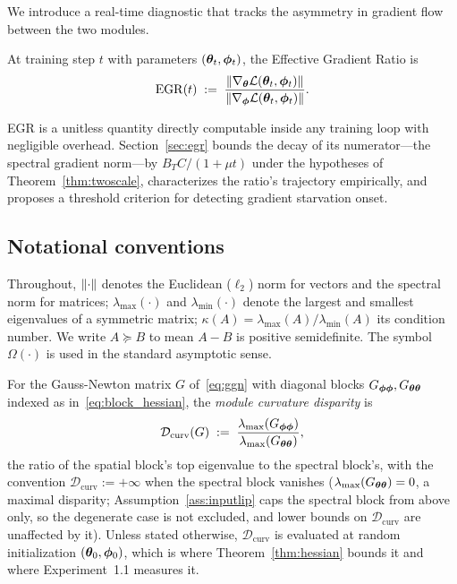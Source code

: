 We introduce a real-time diagnostic that tracks the asymmetry in
gradient flow between the two modules.

\begin{definition}
\label{def:egr}
At training step $t$ with parameters $({\boldsymbol{\theta}}_t, {\boldsymbol{\phi}}_t)$, the
Effective Gradient Ratio is
\[
    \mathrm{EGR}(t) \;:=\; \frac{\left\lVert\nabla_{\boldsymbol{\theta}} \mathcal{L}({\boldsymbol{\theta}}_t, {\boldsymbol{\phi}}_t)\right\rVert}
                        {\left\lVert\nabla_{\boldsymbol{\phi}} \mathcal{L}({\boldsymbol{\theta}}_t, {\boldsymbol{\phi}}_t)\right\rVert}.
\]
\end{definition}

\begin{remark}
EGR is a unitless quantity directly computable inside any training
loop with negligible overhead. Section~\ref{sec:egr} bounds the decay
of its numerator---the spectral gradient norm---by
$B_T C/(1 + \mu t)$ under the hypotheses of
Theorem~\ref{thm:twoscale}, characterizes the
ratio's trajectory empirically, and proposes a threshold criterion
for detecting gradient starvation onset.
\end{remark}

\subsection{Notational conventions}

Throughout, $\left\lVert\cdot\right\rVert$ denotes the Euclidean ($\ell_2$) norm for
vectors and the spectral norm for matrices; $\lambda_{\max}(\cdot)$ and
$\lambda_{\min}(\cdot)$ denote the largest and smallest eigenvalues of
a symmetric matrix; $\kappa(A) = \lambda_{\max}(A)/\lambda_{\min}(A)$
its condition number. We write $A \succeq B$ to mean $A - B$ is
positive semidefinite. The symbol $\Omega(\cdot)$ is used in the
standard asymptotic sense.

\begin{definition}
\label{def:dcurv}
For the Gauss-Newton matrix $G$ of~\eqref{eq:ggn} with diagonal
blocks $G_{{\boldsymbol{\phi}}{\boldsymbol{\phi}}}, G_{{\boldsymbol{\theta}}{\boldsymbol{\theta}}}$ indexed as
in~\eqref{eq:block_hessian}, the \emph{module curvature disparity} is
\[
    \mathcal{D}_{\mathrm{curv}}(G)
    \;:=\; \frac{\lambda_{\max}(G_{{\boldsymbol{\phi}}{\boldsymbol{\phi}}})}
                {\lambda_{\max}(G_{{\boldsymbol{\theta}}{\boldsymbol{\theta}}})},
\]
the ratio of the spatial block's top eigenvalue to the spectral
block's, with the convention $\mathcal{D}_{\mathrm{curv}} :=
+\infty$ when the spectral block vanishes
($\lambda_{\max}(G_{{\boldsymbol{\theta}}{\boldsymbol{\theta}}}) = 0$, a maximal disparity;
Assumption~\ref{ass:inputlip} caps the spectral block from above
only, so the degenerate case is not excluded, and lower bounds on
$\mathcal{D}_{\mathrm{curv}}$ are unaffected by it). Unless stated
otherwise, $\mathcal{D}_{\mathrm{curv}}$ is
evaluated at random initialization $({\boldsymbol{\theta}}_0, {\boldsymbol{\phi}}_0)$, which is
where Theorem~\ref{thm:hessian} bounds it and where
Experiment~1.1 measures it.
\end{definition}

